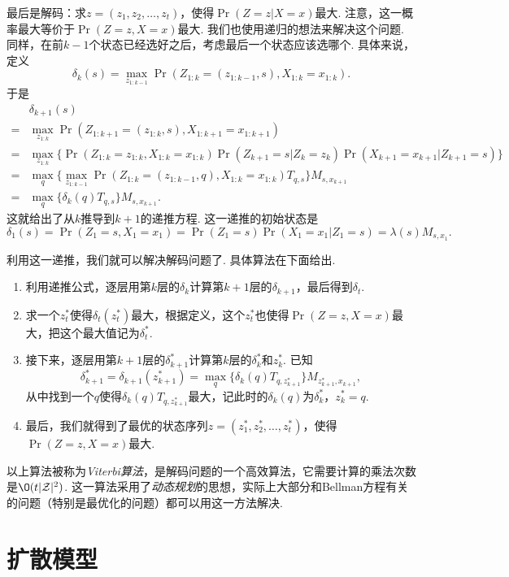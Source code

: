 最后是解码：求$z=(z_1,z_2,\dots,z_t)$，使得$\Pr(Z=z|X=x)$最大. 注意，这一概率最大等价于$\Pr(Z=z,X=x)$最大. 我们也使用递归的想法来解决这个问题. 同样，在前$k-1$个状态已经选好之后，考虑最后一个状态应该选哪个. 具体来说，定义
    \[\delta_k(s) = \max_{z_{1:k-1}}\Pr(Z_{1:k} = (z_{1:k-1}, s), X_{1:k}=x_{1:k}).\]
于是
\begin{align*}
    &\delta_{k+1}(s) \\
    =& \max_{z_{1:k}}\Pr(Z_{1:k+1} = (z_{1:k}, s), X_{1:k+1}=x_{1:k+1})\\
    =& \max_{z_{1:k}}\{\Pr(Z_{1:k} = z_{1:k}, X_{1:k}=x_{1:k})\Pr(Z_{k+1}=s|Z_k=z_k) \Pr(X_{k+1}=x_{k+1}|Z_{k+1}=s)\}\\
    =& \max_{q}\{\max_{z_{1:k-1}}\Pr(Z_{1:k} = (z_{1:k-1},q), X_{1:k}=x_{1:k})T_{q,s}\}M_{s,x_{k+1}}\\
    =& \max_{q}\{\delta_k(q)T_{q,s}\}M_{s,x_{k+1}}.
\end{align*}
这就给出了从$k$推导到$k+1$的递推方程. 这一递推的初始状态是
\[\delta_1(s) = \Pr(Z_1=s, X_1=x_1) = \Pr(Z_1=s)\Pr(X_1=x_1|Z_1=s) = \lambda(s)M_{s,x_1}.\]

利用这一递推，我们就可以解决解码问题了. 具体算法在下面给出.
\begin{enumerate}
    \item 利用递推公式，逐层用第$k$层的$\delta_k$计算第$k+1$层的$\delta_{k+1}$，最后得到$\delta_t$. 
    \item 求一个$z_t^*$使得$\delta_t(z_t^*)$最大，根据定义，这个$z_t^*$也使得$\Pr(Z=z,X=x)$最大，把这个最大值记为$\delta^*_t$.
    \item 接下来，逐层用第$k+1$层的$\delta_{k+1}^*$计算第$k$层的$\delta_k^*$和$z_k^*$. 已知
    \[\delta_{k+1}^*=\delta_{k+1}(z_{k+1}^*)=\max_{q}\{\delta_k(q)T_{q,z_{k+1}^*}\}M_{z_{k+1}^*,x_{k+1}},\]
    从中找到一个$q$使得$\delta_k(q)T_{q,z_{k+1}^*}$最大，记此时的$\delta_k(q)$为$\delta_k^*$，$z_k^*=q$.
    \item 最后，我们就得到了最优的状态序列$z=(z_1^*,z_2^*,\dots,z_t^*)$，使得$\Pr(Z=z,X=x)$最大.
\end{enumerate}
以上算法被称为\emph{Viterbi算法}，是解码问题的一个高效算法，它需要计算的乘法次数是$\O(t|\mathcal Z|^2)$. 这一算法采用了\emph{动态规划}的思想，实际上大部分和Bellman方程有关的问题（特别是最优化的问题）都可以用这一方法解决.

\section{扩散模型}

